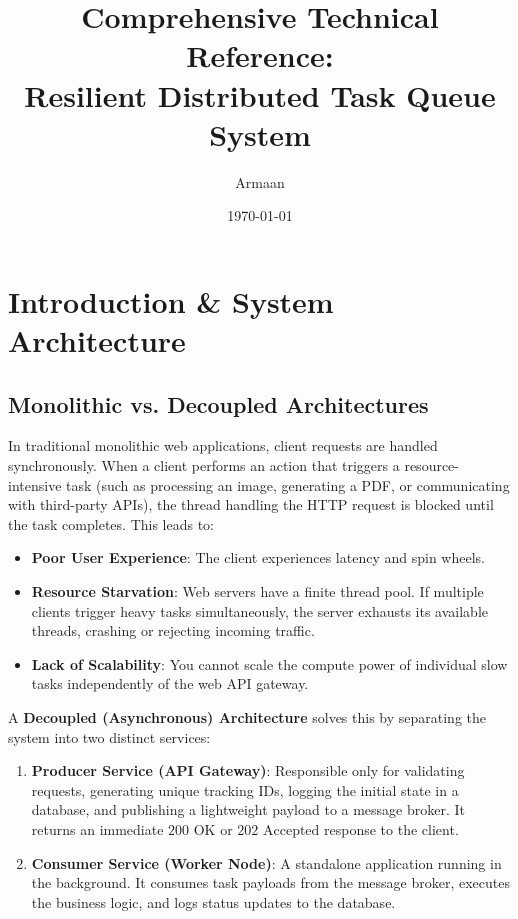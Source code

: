 \documentclass[11pt,a4paper]{article}
\title{\textbf{Comprehensive Technical Reference:\\Resilient Distributed Task Queue System}}
\author{Armaan}
\date{\today}
\begin{document}
\maketitle
\tableofcontents
\newpage

\section{Introduction \& System Architecture}

\subsection{Monolithic vs. Decoupled Architectures}
In traditional monolithic web applications, client requests are handled synchronously. When a client performs an action that triggers a resource-intensive task (such as processing an image, generating a PDF, or communicating with third-party APIs), the thread handling the HTTP request is blocked until the task completes. This leads to:
\begin{itemize}
    \item \textbf{Poor User Experience}: The client experiences latency and spin wheels.
    \item \textbf{Resource Starvation}: Web servers have a finite thread pool. If multiple clients trigger heavy tasks simultaneously, the server exhausts its available threads, crashing or rejecting incoming traffic.
    \item \textbf{Lack of Scalability}: You cannot scale the compute power of individual slow tasks independently of the web API gateway.
\end{itemize}

A \textbf{Decoupled (Asynchronous) Architecture} solves this by separating the system into two distinct services:
\begin{enumerate}
    \item \textbf{Producer Service (API Gateway)}: Responsible only for validating requests, generating unique tracking IDs, logging the initial state in a database, and publishing a lightweight payload to a message broker. It returns an immediate $200\text{ OK}$ or $202\text{ Accepted}$ response to the client.
    \item \textbf{Consumer Service (Worker Node)}: A standalone application running in the background. It consumes task payloads from the message broker, executes the business logic, and logs status updates to the database.
\end{enumerate}
\end{document}
